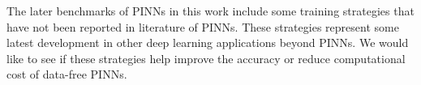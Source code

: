 The later benchmarks of PINNs in this work include some training strategies that have not been reported in literature of PINNs.
These strategies represent some latest development in other deep learning applications beyond PINNs.
We would like to see if these strategies help improve the accuracy or reduce computational cost of data-free PINNs.
